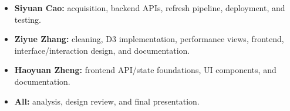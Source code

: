 \documentclass[
  17pt,
  a1paper,
  portrait
]{tikzposter}
\newcommand{\tightitems}{
  \setlength{\itemsep}{0.18em}
  \setlength{\parsep}{0pt}
  \setlength{\parskip}{0pt}
  \setlength{\topsep}{0.1em}
}
\begin{document}
{\begin{minipage}[t]{0.32\linewidth}
    {\fontsize{13}{15}\selectfont
      \begin{itemize}\tightitems
        \item \textbf{Siyuan Cao:}
          acquisition, backend APIs, refresh
          pipeline, deployment, and testing.

        \item \textbf{Ziyue Zhang:}
          cleaning, D3 implementation,
          performance views, frontend,
          interface/interaction design,
          and documentation.

        \item \textbf{Haoyuan Zheng:}
          frontend API/state foundations,
          UI components, and documentation.

        \item \textbf{All:}
          analysis, design review,
          and final presentation.
      \end{itemize}
    }
  \end{minipage}
}
\end{document}

